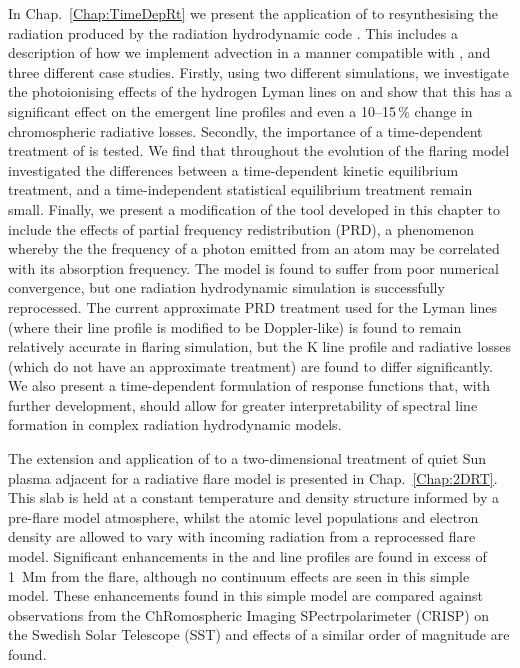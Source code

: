 In Chap.~\ref{Chap:TimeDepRt} we present the application of \Lw{} to resynthesising the radiation produced by the radiation hydrodynamic code \Radyn{}.
This includes a description of how we implement advection in a manner compatible with \Radyn{}, and three different case studies.
Firstly, using two different \Radyn{} simulations, we investigate the photoionising effects of the hydrogen Lyman lines on \Caii{} and show that this has a significant effect on the emergent line profiles and even a 10--15\,\% change in chromospheric radiative losses.
Secondly, the importance of a time-dependent treatment of \Caii{} is tested.
We find that throughout the evolution of the flaring model investigated the differences between a time-dependent kinetic equilibrium treatment, and a time-independent statistical equilibrium treatment remain small.
Finally, we present a modification of the tool developed in this chapter to include the effects of partial frequency redistribution (PRD), a phenomenon whereby the the frequency of a photon emitted from an atom may be correlated with its absorption frequency.
The model is found to suffer from poor numerical convergence, but one radiation hydrodynamic simulation is successfully reprocessed.
The current approximate PRD treatment used for the Lyman lines (where their line profile is modified to be Doppler-like) is found to remain relatively accurate in flaring simulation, but the \Caii{} K line profile and radiative losses (which do not have an approximate treatment) are found to differ significantly.
We also present a time-dependent formulation of response functions that, with further development, should allow for greater interpretability of spectral line formation in complex radiation hydrodynamic models.

The extension and application of \Lw{} to a two-dimensional treatment of quiet Sun plasma adjacent for a radiative flare model is presented in Chap.~\ref{Chap:2DRT}.
This slab is held at a constant temperature and density structure informed by a \Radyn{} pre-flare model atmosphere, whilst the atomic level populations and electron density are allowed to vary with incoming radiation from a reprocessed \Radyn{} flare model.
Significant enhancements in the \Ha{} and \CaLine{} line profiles are found in excess of \SI{1}{\mega\m} from the flare, although no continuum effects are seen in this simple model.
These enhancements found in this simple model are compared against observations from the ChRomospheric Imaging SPectrpolarimeter (CRISP) on the Swedish Solar Telescope (SST) and effects of a similar order of magnitude are found.

